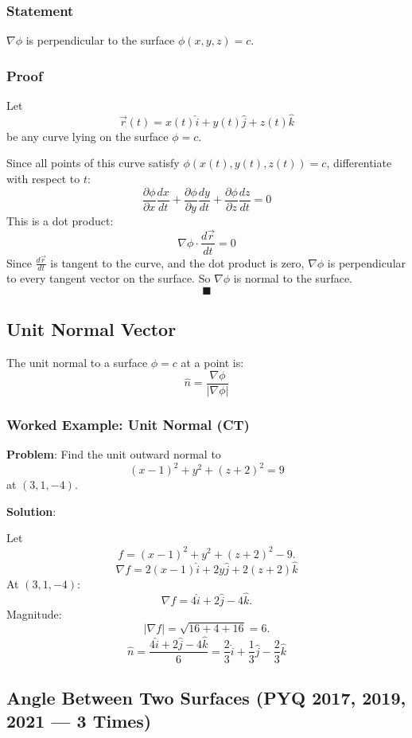 \documentclass[
]{article}
\begin{document}
\subsubsection{Statement}\label{statement}

\(\nabla\phi\) is perpendicular to the surface \(\phi(x, y, z) = c\).

\subsubsection{Proof}\label{proof}

Let
\[
\vec{r}(t) = x(t)\hat{i} + y(t)\hat{j} + z(t)\hat{k}
\]
be any curve lying on the surface \(\phi = c\).

Since all points of this curve satisfy \(\phi(x(t), y(t), z(t)) = c\),
differentiate with respect to \(t\):
\[
\frac{\partial\phi}{\partial x}\frac{dx}{dt} + \frac{\partial\phi}{\partial y}\frac{dy}{dt} + \frac{\partial\phi}{\partial z}\frac{dz}{dt} = 0
\]
This is a dot product:
\[
\nabla\phi \cdot \frac{d\vec{r}}{dt} = 0
\]
Since \(\frac{d\vec{r}}{dt}\) is tangent to the curve, and the dot
product is zero, \(\nabla\phi\) is perpendicular to every tangent vector
on the surface. So \(\nabla\phi\) is normal to the surface.
\[
\blacksquare
\]

\subsection{Unit Normal Vector}\label{unit-normal-vector}

The unit normal to a surface \(\phi = c\) at a point is:
\[
\hat{n} = \frac{\nabla\phi}{|\nabla\phi|}
\]
\subsubsection{Worked Example: Unit Normal
(CT)}\label{worked-example-unit-normal-ct}

\textbf{Problem}: Find the unit outward normal to
\[
(x-1)^2 + y^2 + (z+2)^2 = 9
\]
at \((3, 1, -4)\).

\textbf{Solution}:

Let
\[
f = (x-1)^2 + y^2 + (z+2)^2 - 9.
\]
\[
\nabla f = 2(x-1)\hat{i} + 2y\hat{j} + 2(z+2)\hat{k}
\]
At \((3, 1, -4)\):
\[
\nabla f = 4\hat{i} + 2\hat{j} - 4\hat{k}.
\]
Magnitude:
\[
\lvert \nabla f \rvert = \sqrt{16 + 4 + 16} = 6.
\]
\[
\hat{n} = \frac{4\hat{i} + 2\hat{j} - 4\hat{k}}{6} = \frac{2}{3}\hat{i} + \frac{1}{3}\hat{j} - \frac{2}{3}\hat{k}
\]

\subsection{Angle Between Two Surfaces (PYQ 2017, 2019, 2021 --- 3
Times)}\label{angle-between-two-surfaces-pyq-2017-2019-2021-3-times}
\end{document}
